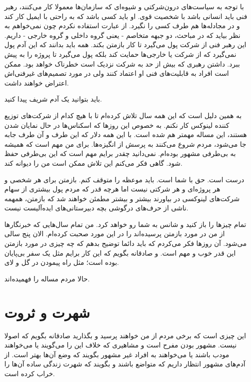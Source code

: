 با توجه به سیاست‌های درون‌شرکتی و شیوه‌ای که سازمان‌ها معمولا کار می‌کنند،
رهبر فنی باید انسانی باشد با شخصیت قوی. او باید کسی باشد که به راحتی
با ایمیل کار کند و در مجادله‌ها هم طرف کسی را نگیرد. از عبارت
 استفاده نکردم چون نمی‌خواهم به نظر بیاید که در مباحث،
دو جبهه متخاصم - یعنی گروه داخلی و گروه خارجی - داریم. این رهبر فنی از
شرکت پول می‌گیرد تا کار بازمتن بکند. همه باید بدانند که این آدم پول
نمی‌گیرد که از شرکت یا خارجی‌ها حمایت کند بلکه پول می‌گیرد تا پروژه را به
پیش ببرد. داشتن رهبری که بیش از حد به شرکت نزدیک است خطرناک خواهد
بود. ممکن است افراد به قابلیت‌های فنی او اعتماد کنند ولی در مورد
تصمیم‌های غیرفنی‌اش اعتراض خواهند داشت.

باید بتوانید یک آدم شریف پیدا کنید. 

به همین دلیل است که این همه سال تلاش کرده‌ام تا با هیچ کدام از شرکت‌های
توزیع کننده لینوکس کار نکنم. به خصوص این روزها که اسکناس‌ها در حال
نمایان شدن هستند، این مساله مهمتر هم شده است. با این همه دلار که این
طرف و آن طرف جابه جا می‌شود،‌ مردم شروع می‌کنند به پرسش از انگیزه‌ها. برای
من مهم است که همیشه به بی‌طرفی مشهور بوده‌ام. نمی‌دانید چقدر برایم مهم
است که این بی‌طرفی حفظ شود. گاهی فکر می‌کنم این تلاش ممکن است من را
دیوانه کند.

درست است. حق با شما است. باید موعظه را متوقف کنم. بازمتن برای هر شخصی
و هر پروژه‌ای و هر شرکتی نیست اما هرچه قدر که مردم پول بیشتری از سهام
شرکت‌های لینوکسی در بیاورند بیشتر و بیشتر مطمئن خواهند شد که بازمتن،‌
همهمه ناشی از حرف‌های درگوشی بچه دبیرستانی‌های ایده‌آلیست نیست.

تمام چیزها را باز کنید و شانس به شما رو خواهد کرد. من تمام سال‌هایی که
خبرنگارها از من در مورد بازمتن پرسیده‌اند را در این مورد صحبت
کرده‌ام. الان پنج سالی می‌شود. آن روزها فکر می‌کردم که باید دائما توضیح
بدهم که چه چیزی در مورد بازمتن این قدر خوب و مهم است. و صادقانه بگویم
که این کار برایم مثل یک سفر بی‌پایان بوده است؛ مثل راه پیمودن در گل و
لای.

حالا مردم مساله را فهمیده‌اند. 

\section{شهرت و ثروت}
 این چیزی است که برخی مردم از من
خواهند پرسید و بگذارید صادقانه بگویم که  اصولا
 نیست. مشهور بودن مفرح است و مشاهیری که خلاف این را
می‌گویند یا می‌خواهند مودب باشند یا می‌خواهند به افراد غیر مشهور بگویند
که وضع آن‌ها بهتر است. از آدم‌های مشهور انتظار داریم که متواضع باشند و
بگویند که شهرت زندگی ساده آن‌ها را خراب کرده است.


